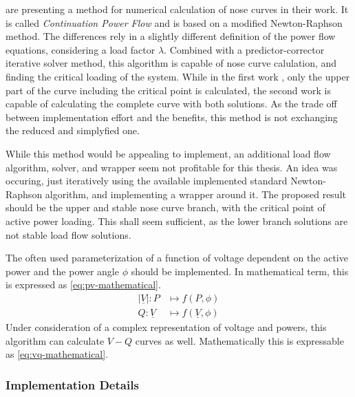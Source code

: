 \textcite{ajjarapu_1992, ajjarapu_2007} are presenting a method for numerical calculation of nose curves in their work. 
It is called {\itshape Continuation Power Flow} and is based on a modified Newton-Raphson method.
The differences rely in a slightly different definition of the power flow equations, considering a load factor $\lambda$.
Combined with a predictor-corrector iterative solver method, this algorithm is capable of nose curve calulation, and finding the critical loading of the system.
While in the first work \autocite{ajjarapu_1992}, only the upper part of the curve including the critical point is calculated, the second work \autocite{ajjarapu_2007} is capable of calculating the complete curve with both solutions. 
As the trade off between implementation effort and the benefits, this method is not exchanging the reduced and simplyfied one.

While this method would be appealing to implement, an additional load flow algorithm, solver, and wrapper seem not profitable for this thesis.
An idea was occuring, just iteratively using the available implemented standard Newton-Raphson algorithm, and implementing a wrapper around it.
The proposed result should be the upper and stable nose curve branch, with the critical point of active power loading.
This shall seem sufficient, as the lower branch solutions are not stable load flow solutions.

The often used parameterization of a function of voltage dependent on the active power and the power angle $\phi$ should be implemented.
In mathematical term, this is expressed as \autoref{eq:pv-mathematical}.
\begin{align}
        \vert \underline{V} \vert : P &\mapsto f(P, \phi) \label{eq:pv-mathematical} \\[6pt]
        Q : \underline{V} &\mapsto f(\underline{V}, \phi) \label{eq:vq-mathematical}
\end{align}
Under consideration of a complex representation of voltage and powers, this algorithm can calculate $V-Q$ curves as well. 
Mathematically this is expressable as \autoref{eq:vq-mathematical}.

\subsubsection{Implementation Details}

